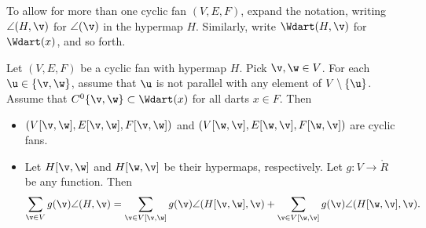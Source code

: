 To allow for more than one cyclic fan $(V,E,F)$, expand the notation,
writing $\angle(H,\v)$ for $\angle(\v)$ in the hypermap $H$.
Similarly, write $\Wdart(H,\v)$ for $\Wdart(x)$, and so forth.
%
%


\begin{lemma}[slicing]\label{lemma:slice} Let
$(V,E,F)$ be a cyclic fan with hypermap $H$.  Pick $\v,\w\in V$. For
each $\u\in \{\v,\w\}$, assume that $\u$ is not parallel with  any
element of $V\setminus\{\u\}$.  Assume that $C^0\{\v,\w\}\subset
\Wdart(x)$ for all darts $x\in F$.  Then
\begin{itemize}
\item $(V[\v,\w],E[\v,\w],F[\v,\w])$ and
$(V[\w,\v],E[\w,\v],F[\w,\v])$ are cyclic fans.
\item Let $H[\v,\w]$ and $H[\w,\v]$ be their hypermaps, respectively.
Let $g:V\to\ring{R}$ be any function.  Then
\begin{displaymath}
  \sum_{\v\in V} g(\v)\angle(H,\v) 
  = \sum_{\v\in V[\v,\w]}g(\v)\angle(H[\v,\w],\v) 
  + \sum_{\v\in V[\w,\v]}g(\v)\angle(H[\w,\v],\v).
\end{displaymath}
\end{itemize}
\end{lemma}
%
%

